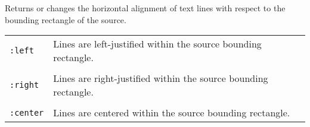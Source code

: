 \begin{flushright} \parbox[t]{6.125in}{
Returns or changes the horizontal alignment of text lines with respect to the
bounding rectangle of the source.

\begin{center}
\begin{tabular}{ll}
{\tt :left} & Lines are left-justified within the source bounding rectangle.\\ \\
{\tt :right} & Lines are right-justified within the source bounding rectangle.\\ \\
{\tt :center} & Lines are centered within the source bounding rectangle.\\
\end{tabular}
\end{center}}
\end{flushright}


%
%
%
%

